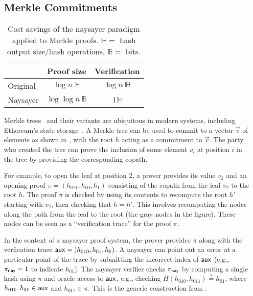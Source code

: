 
\subsection{Merkle Commitments}\label{sec:merkle_naysayer}

\begin{table}[h!]
   \centering
    \setlength{\belowbottomsep}{6pt}
    \begin{tabular}{l c c} 
    \toprule
     & \textbf{Proof size}
     & \textbf{Verification}
     \\ \midrule
     Original
     & $\log{n}\ \mathbb{H}$
     & $\log{n}\ \mathbb{H}$
     \\\midrule
     Naysayer
     & $\log\log{n}\ \mathbb{B}$
     & $1\mathbb{H}$
    \\ \bottomrule
    \end{tabular}
    \caption{Cost savings of the naysayer paradigm applied to Merkle proofs. $\mathbb{H} =$ hash output size/hash operations, $\mathbb{B} =$ bits.}
    \label{tab:merkle_asym}
\end{table}

Merkle trees~\cite{C:Merkle87} and their variants are ubiquitous in modern systems, including Ethereum's state storage~\cite{ethereum_trie}. A Merkle tree can be used to commit to a vector $\vec{v}$ of elements as shown in , with the root $h$ acting as a commitment to $\vec{v}$. The party who created the tree can prove the inclusion of some element $v_i$ at position $i$ in the tree by providing the corresponding copath. 


    
For example, to open the leaf at position 2, a prover provides its value $v_2$ and an opening proof $\pi = (h_{011}, h_{00}, h_{1})$ consisting of the copath from the leaf $v_2$ to the root $h$. The proof $\pi$ is checked by using its contents to recompute the root $h'$ starting with $v_2$, then checking that $h = h'$. This involves recomputing the nodes along the path from the leaf to the root (the gray nodes in the figure). These nodes can be seen as a ``verification trace'' for the proof $\pi$.

In the context of a naysayer proof system, the prover provides $\pi$ along with the verfication trace $\mathsf{aux} = (h_{010}, h_{01}, h_{0})$. A naysayer can point out an error at a particular point of the trace by submitting the incorrect index of $\mathsf{aux}$ (e.g., $\pi_{\mathsf{nay}} = 1$ to indicate $h_{01}$). The naysayer verifier checks $\pi_{\mathsf{nay}}$ by computing a single hash using $\pi$ and oracle access to $\mathsf{aux}$, e.g., checking $H(h_{010}, h_{011}) \stackrel{?}{=} h_{01}$, where $h_{010}, h_{01} \in \mathsf{aux}$ and $h_{011} \in \pi$. This is the generic construction from .

